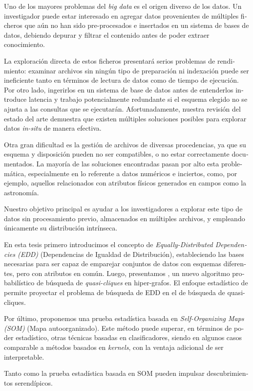 \begin{otherlanguage}{spanish}
{\fontsize{11}{11}\selectfont
Uno de los mayores problemas del \textit{big data} es el origen diverso de los datos.
Un investigador puede estar interesado en agregar datos provenientes de múltiples
ficheros que aún no han sido pre-procesados e insertados en un sistema de bases de datos,
debiendo depurar y filtrar el contenido antes de poder extraer conocimiento.

La exploración directa de estos ficheros presentará serios problemas de rendimiento:
examinar archivos sin ningún tipo de preparación ni indexación puede ser ineficiente tanto
en términos de lectura de datos como de tiempo de ejecución. Por otro lado, ingerirlos en
un sistema de base de datos antes de entenderlos
introduce latencia y trabajo potencialmente redundante si el esquema
elegido no se ajusta a las consultas que se ejecutarán. Afortunadamente, nuestra revisión del estado del arte
demuestra que existen múltiples soluciones posibles para explorar datos \emph{in-situ} de manera efectiva.

Otra gran dificultad es la gestión de archivos de diversas procedencias, ya que su esquema y disposición pueden
no ser compatibles, o no estar correctamente documentados. La mayoría de las soluciones encontradas
pasan por alto esta problemática, especialmente en lo referente a datos numéricos e inciertos,
como, por ejemplo, aquellos relacionados con atributos físicos generados en campos como la astronomía.

Nuestro objetivo principal es ayudar a los investigadores a explorar este tipo de datos sin
procesamiento previo, almacenados en múltiples archivos, y empleando únicamente su distribución intrínseca.

En esta tesis primero introducimos el concepto de \textit{Equally-Distributed Dependencies (EDD)}
(Dependencias de Igualdad de Distribución), estableciendo las bases necesarias para ser capaz
de emparejar conjuntos de datos con esquemas diferentes, pero con atributos en común.
Luego, presentamos \PresQ, un nuevo algoritmo probabilístico de búsqueda de \textit{quasi-cliques} en hiper-grafos.
El enfoque estadístico de \PresQ permite proyectar el problema de búsqueda de EDD en el de búsqueda
de quasi-cliques.

Por último, proponemos una prueba estadística basada en \textit{Self-Organizing Maps (SOM)} (Mapa autoorganizado).
Este método puede superar, en términos de poder estadístico, otras técnicas
basadas en clasificadores, siendo en algunos casos comparable a métodos basados en \textit{kernels},
con la ventaja adicional de ser interpretable.

Tanto \PresQ como la prueba estadística basada en SOM pueden impulsar descubrimientos serendípicos.
}
\end{otherlanguage}
